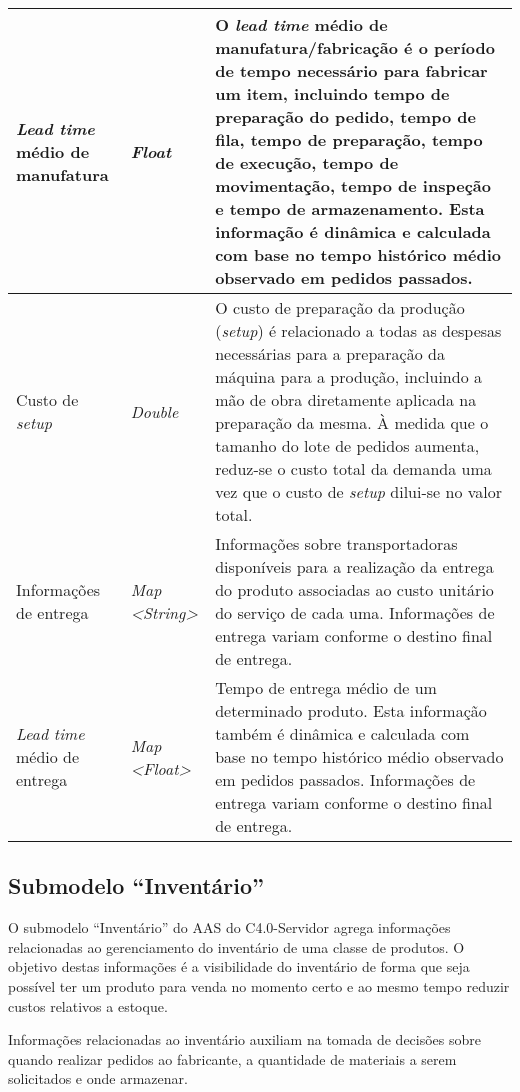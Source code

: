\begin{longtable}{|p{}|p{}|p{}|}
	\\ \hline \textit{Lead time} médio de manufatura & \textit{Float} & O \textit{lead time} médio de manufatura/fabricação é o período de tempo necessário para fabricar um item, incluindo tempo de preparação do pedido, tempo de fila, tempo de preparação, tempo de execução, tempo de movimentação, tempo de inspeção e tempo de armazenamento. Esta informação é dinâmica e calculada com base no tempo histórico médio observado em pedidos passados.

	\\ \hline Custo de \textit{setup} & \textit{Double} & O custo de preparação da produção (\textit{setup}) é relacionado a todas as despesas necessárias para a preparação da máquina para a produção, incluindo a mão de obra diretamente aplicada na preparação da mesma. À medida que o tamanho do lote de pedidos aumenta, reduz-se o custo total da demanda uma vez que o custo de \textit{setup} dilui-se no valor total.

	\\ \hline Informações de entrega & \textit{Map <String>} & Informações sobre transportadoras disponíveis para a realização da entrega do produto associadas ao custo unitário do serviço de cada uma. Informações de entrega variam conforme o destino final de entrega.

	\\ \hline \textit{Lead time} médio de entrega & \textit{Map <Float>} & Tempo de entrega médio de um determinado produto. Esta informação também é dinâmica e calculada com base no tempo histórico médio observado em pedidos passados. Informações de entrega variam conforme o destino final de entrega.

	\\ \hline
\end{longtable}

\subsection{Submodelo ``Inventário''}

O submodelo ``Inventário'' do AAS do C4.0-Servidor agrega informações relacionadas ao gerenciamento do inventário de uma classe de produtos. O objetivo destas informações é a visibilidade do inventário de forma que seja possível ter um produto para venda no momento certo e ao mesmo tempo reduzir custos relativos a estoque.

Informações relacionadas ao inventário auxiliam na tomada de decisões sobre quando realizar pedidos ao fabricante, a quantidade de materiais a serem solicitados e onde armazenar.

